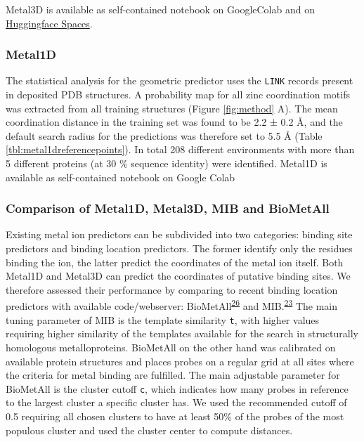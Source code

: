 \documentclass[  ASAPversion,
  ,
  9pt]{elife}
\begin{document}
Metal3D is available as self-contained notebook on GoogleColab and on \href{https://hf.space/simonduerr/metal3d}{Huggingface Spaces}.

\hypertarget{metal1d}{%
\subsubsection{Metal1D}\label{metal1d}}

The statistical analysis for the geometric predictor uses the \texttt{LINK} records present in deposited PDB structures. A probability map for all zinc coordination motifs was extracted from all training structures (Figure \ref{fig:method} A). The mean coordination distance in the training set was found to be 2.2 ± 0.2 Å, and the default search radius for the predictions was therefore set to 5.5 Å (Table \ref{tbl:metal1dreferencepoints}). In total 208 different environments with more than 5 different proteins (at 30 \% sequence identity) were identified.
Metal1D is available as self-contained notebook on Google Colab

\hypertarget{comparison-of-metal1d-metal3d-mib-and-biometall}{%
\subsubsection{Comparison of Metal1D, Metal3D, MIB and BioMetAll}\label{comparison-of-metal1d-metal3d-mib-and-biometall}}

Existing metal ion predictors can be subdivided into two categories: binding site predictors and binding location predictors. The former identify only the residues binding the ion, the latter predict the coordinates of the metal ion itself. Both Metal1D and Metal3D can predict the coordinates of putative binding sites. We therefore assessed their performance by comparing to recent binding location predictors with available code/webserver: BioMetAll\textsuperscript{\protect\hyperlink{ref-iHxzzTCG}{26}} and MIB.\textsuperscript{\protect\hyperlink{ref-1HMhB3vxM}{23}} The main tuning parameter of MIB is the template similarity \texttt{t}, with higher values requiring higher similarity of the templates available for the search in structurally homologous metalloproteins. BioMetAll on the other hand was calibrated on available protein structures and places probes on a regular grid at all sites where the criteria for metal binding are fulfilled. The main adjustable parameter for BioMetAll is the cluster cutoff \texttt{c}, which indicates how many probes in reference to the largest cluster a specific cluster has. We used the recommended cutoff of 0.5 requiring all chosen clusters to have at least 50\% of the probes of the most populous cluster and used the cluster center to compute distances.
\end{document}
